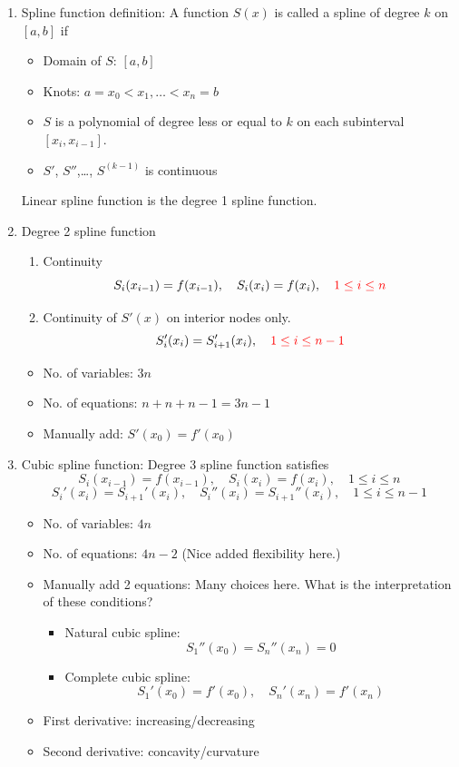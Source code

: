 \documentclass{article}
\theoremstyle{remark}
\begin{document}
\begin{enumerate}
\item Spline function definition: A function $S(x)$ is called a spline of degree $k$ on $[a,b]$ if 
\begin{itemize}
\item Domain of $S$: $[a,b]$
\item Knots: $a = x_0 < x_1,\dots < x_n = b$
\item $S$ is a polynomial of degree less or equal to $k$ on each subinterval $[x_i,x_{i-1}]$.
\item $S'$, $S''$,\dots, $S^{(k-1)}$ is continuous
\end{itemize}
Linear spline function is the degree 1 spline function.


\item Degree 2 spline function
\begin{enumerate}
\item Continuity
$$
S_i(x_{i-1}) = f(x_{i-1}),\quad S_i(x_{i}) = f(x_{i}),\quad {\color{red} 1\leq i \leq n}
$$
\item Continuity of $S'(x)$ on interior nodes only.
$$
S_i'(x_{i}) = S_{i+1}'(x_{i}), \quad {\color{red}  1\leq i \leq n-1}
$$

\end{enumerate}

\begin{itemize}
\item No. of variables: $3n$
\item No. of equations: $n + n + n-1 = 3n-1$
\item Manually add: $S'(x_0) = f'(x_0)$
\end{itemize}



\item Cubic spline function: Degree 3 spline function satisfies
$$
S_i(x_{i-1}) = f(x_{i-1}),\quad S_i(x_{i}) = f(x_{i}),\quad 1\leq i \leq n
$$
$$
S_i'(x_{i}) = S_{i+1}'(x_{i}), \quad S_i''(x_{i}) = S_{i+1}''(x_{i}), \quad 1\leq i \leq n-1
$$
\begin{itemize}
\item No. of variables: $4n$
\item No. of equations: $4n-2$ (Nice added flexibility here.)
\item Manually add 2 equations: Many choices here. What is the interpretation of these conditions?
\begin{itemize}
\item {\color{red} Natural} cubic spline:
$$
S_1''(x_0) = S_n''(x_n) = 0
$$
\item {\color{red} Complete} cubic spline:
$$
S_1'(x_0) = f'(x_0),\quad S_n'(x_n) = f'(x_n)
$$
\end{itemize}
\item First derivative: increasing/decreasing
\item Second derivative: concavity/curvature
\end{itemize}



\end{enumerate}
\end{document}
